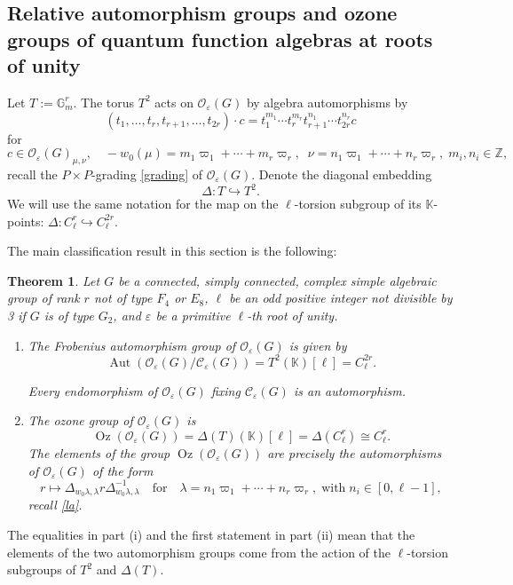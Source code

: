 \documentclass[11pt]{amsart}
\theoremstyle{plain}
\newtheorem{theorem}{Theorem}[section]
\newcommand \bth[1] { \begin{theorem}\label{t#1} }
\renewcommand {\eth} { \end{theorem} }
\def \KK {{\mathbb C}}
\def \KK {{\mathbb K}}
\def \Gset {{\mathbb G}}
\def \Zset {{\mathbb Z}}
\def \cC {\mathcal{C}}
\def \OO {{\mathcal{O}}}
\def \vpi {\varpi}
\def \la {\lambda}
\def \ep {\varepsilon}
\def \mt  {\mapsto}
\def \hra {\hookrightarrow}
\DeclareMathOperator \Aut { {\mathrm{Aut}} }
\DeclareMathOperator \Oz { {\mathrm{Oz}}}
\begin{document}
\subsection{Relative automorphism groups and ozone groups of quantum function algebras at roots of unity}
Let $T:= \Gset_m^r$. The torus $T^2$ acts on $\OO_\ep(G)$ by algebra automorphisms by 
\begin{equation}
\label{TactO}
(t_1, \ldots, t_r, t_{r+1}, \ldots, t_{2r}) \cdot c = t_1^{m_1} \cdots t_r^{m_r} t_{r+1}^{n_1} \cdots t_{2r}^{n_r} c
\end{equation}
for
\[
c \in \OO_\ep(G)_{\mu, \nu}, \quad - w_0(\mu) = m_1 \vpi_1 + \cdots + m_r \vpi_r, \; \; 
\nu = n_1 \vpi_1 + \cdots + n_r \vpi_r, \; m_i, n_i \in \Zset,
\]
recall the $P \times P$-grading \eqref{grading} of $\OO_\ep(G)$. Denote the diagonal embedding
\[
\Delta : T \hra T^2.
\]
We will use the same notation for the map on the $\ell$-torsion subgroup of its $\KK$-points: $\Delta : C_\ell^r \hra C_\ell^{2 r}$. 


The main classification result in this section is the following:

\bth{Oepgroup}
Let $G$ be a connected, simply connected, complex simple algebraic group of rank $r$ not of type $F_4$ or $E_8$, $\ell$ be an odd positive integer
not divisible by 3 if $G$ is of type $G_2$, and $\ep$ be a primitive $\ell$-th root of unity. 

\begin{enumerate}
\item[(i)] The Frobenius automorphism group of $\OO_\ep(G)$  is given by 
\[
\Aut(\OO_\ep(G)/\cC_\ep(G)) = T^2(\KK)[\ell] = C_\ell^{2r}.
\]

Every endomorphism of $\OO_\ep(G)$ fixing $\cC_\ep(G)$ is an automorphism.

\item[(ii)] The ozone group of $\OO_\ep(G)$ is
\[
\Oz(\OO_\ep(G)) = \Delta(T)(\KK)[\ell] =  \Delta(C_\ell^{r}) \cong C_\ell^r.
\]
The elements of the group $\Oz(\OO_\ep(G))$ are precisely the automorphisms of $\OO_\ep(G)$ of the form 
\[
r \mt 
\Delta_{w_0 \la, \la} r \Delta_{w_0 \la, \la}^{-1} \quad \mbox{for} \quad\la = n_1 \varpi_1 + \cdots + n_r \varpi_r, \; \mbox{with} \; n_i \in [0, \ell -1],
\]
recall \eqref{la}.
\end{enumerate}
\eth
The equalities in part (i) and the first statement in part (ii) mean that the elements of the two automorphism groups come from the action of the $\ell$-torsion subgroups of $T^2$ and $\Delta(T)$.
\end{document}
